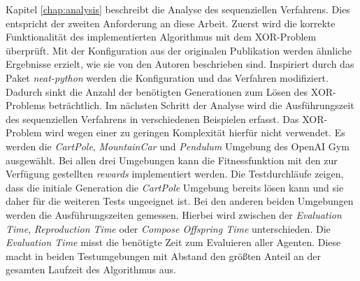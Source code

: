 Kapitel \ref{chap:analysis} beschreibt die Analyse des sequenziellen Verfahrens. Dies entspricht der zweiten Anforderung an diese Arbeit. Zuerst wird die korrekte Funktionalität des implementierten Algorithmus mit dem XOR-Problem überprüft. Mit der Konfiguration aus der originalen Publikation werden ähnliche Ergebnisse erzielt, wie sie von den Autoren beschrieben sind. Inspiriert durch das Paket \emph{neat-python} werden die Konfiguration und das Verfahren modifiziert. Dadurch sinkt die Anzahl der benötigten Generationen zum Lösen des XOR-Problems beträchtlich. Im nächsten Schritt der Analyse wird die Ausführungszeit des sequenziellen Verfahrens in verschiedenen Beispielen erfasst. Das XOR-Problem wird wegen einer zu geringen Komplexität hierfür nicht verwendet. Es werden die \emph{CartPole}, \emph{MountainCar} und \emph{Pendulum} Umgebung des OpenAI Gym ausgewählt. Bei allen drei Umgebungen kann die Fitnessfunktion mit den zur Verfügung gestellten \emph{rewards} implementiert werden. Die Testdurchläufe zeigen, dass die initiale Generation die \emph{CartPole} Umgebung bereits lösen kann und sie daher für die weiteren Tests ungeeignet ist. Bei den anderen beiden Umgebungen werden die Ausführungszeiten gemessen. Hierbei wird zwischen der \emph{Evaluation Time}, \emph{Reproduction Time} oder \emph{Compose Offspring Time} unterschieden. Die \emph{Evaluation Time} misst die benötigte Zeit zum Evaluieren aller Agenten. Diese macht in beiden Testumgebungen mit Abstand den größten Anteil an der gesamten Laufzeit des Algorithmus aus.
\\\\
